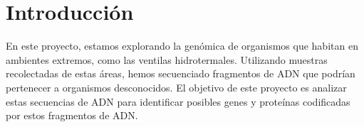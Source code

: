 \section*{Introducción} %
\label{sec:introduccion} %
En este proyecto, estamos explorando la genómica de organismos que habitan en ambientes extremos, como las ventilas hidrotermales. Utilizando muestras recolectadas de estas áreas, hemos secuenciado fragmentos de ADN que podrían pertenecer a organismos desconocidos. El objetivo de este proyecto es analizar estas secuencias de ADN para identificar posibles genes y proteínas codificadas por estos fragmentos de ADN.

